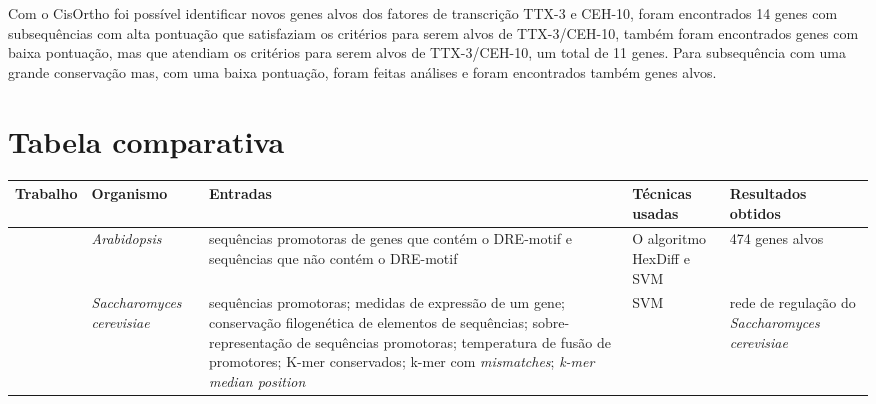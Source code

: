 Com o CisOrtho foi possível identificar novos genes alvos dos fatores de transcrição TTX-3 e CEH-10, foram encontrados 14 genes com subsequências com alta pontuação que satisfaziam os critérios para serem alvos de TTX-3/CEH-10, também foram encontrados genes com baixa pontuação, mas que atendiam os critérios para serem alvos de TTX-3/CEH-10, um total de 11 genes. Para subsequência com uma grande conservação mas, com uma baixa pontuação, foram feitas análises e foram encontrados também genes alvos.




\section{Tabela comparativa}


\begin{tabularx}{\textwidth}{ |X|X|X|X|X| }    \hline
		  Trabalho	   & Organismo    & Entradas     & Técnicas usadas & Resultados obtidos       \\ \hline \hline	

    \cite{Wang2009}     	 &  \textit{Arabidopsis} & sequências promotoras de genes que contém o DRE-motif e sequências que não contém o DRE-motif  & O algoritmo HexDiff e SVM & 474 genes alvos  \\ \hline
    \cite{Holloway2008} 	   & \textit{Saccharomyces cerevisiae}  & sequências promotoras; medidas de expressão de um gene; conservação filogenética de elementos de sequências; sobre-representação de sequências promotoras; temperatura de fusão de promotores; K-mer conservados; k-mer com \textit{mismatches}; \textit{k-mer median position} & SVM & rede de regulação do \textit{Saccharomyces cerevisiae}\\ \hline

\end{tabularx}



